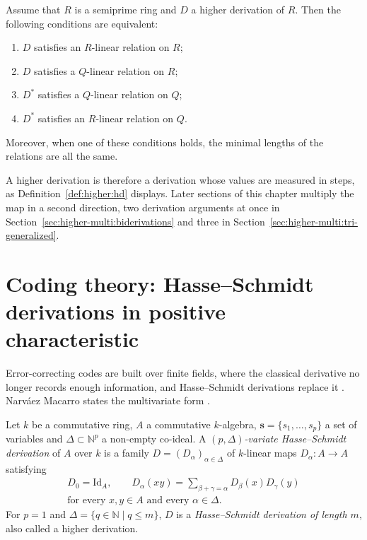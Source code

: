 \begin{theorem}\label{thm:higher:relations}
Assume that $R$ is a semiprime ring and $D$ a higher derivation of $R$.
Then the following conditions are equivalent:
\begin{enumerate}[label=(\roman*)]
\item $D$ satisfies an $R$-linear relation on $R$;
\item $D$ satisfies a $Q$-linear relation on $R$;
\item $D^{*}$ satisfies a $Q$-linear relation on $Q$;
\item $D^{*}$ satisfies an $R$-linear relation on $Q$.
\end{enumerate}
Moreover, when one of these conditions holds, the minimal lengths of the
relations are all the same.
\end{theorem}

A higher derivation is therefore a derivation whose values are measured in
steps, as Definition~\ref{def:higher:hd} displays. Later sections of this
chapter multiply the map in a second direction, two derivation arguments at
once in Section~\ref{sec:higher-multi:biderivations} and three in
Section~\ref{sec:higher-multi:tri-generalized}.

\section{Coding theory: Hasse--Schmidt derivations in positive characteristic}\label{sec:higher-multi:coding}

Error-correcting codes are built over finite fields, where the classical
derivative no longer records enough information, and Hasse--Schmidt
derivations replace it \cite[Introduction]{NarvaezMacarro2020}. Narv\'aez
Macarro states the multivariate form
\cite[Definition~2.1.1, p.~15]{NarvaezMacarro2020}.

\begin{definition}\label{def:higher:hasse-schmidt-variate}
Let $k$ be a commutative ring, $A$ a commutative $k$-algebra, $\mathbf{s}=\{s_1,\dots,s_p\}$
a set of variables and $\Delta\subset\mathbb{N}^p$ a non-empty co-ideal. A
\emph{$(p,\Delta)$-variate Hasse--Schmidt derivation} of $A$ over $k$ is a
family $D=(D_\alpha)_{\alpha\in\Delta}$ of $k$-linear maps $D_\alpha\colon A\to A$
satisfying
\begin{gather*}
D_0=\mathrm{Id}_A,\qquad D_\alpha(xy)=\sum_{\beta+\gamma=\alpha}D_\beta(x)D_\gamma(y)\\
\text{for every }x,y\in A\text{ and every }\alpha\in\Delta.
\end{gather*}
For $p=1$ and $\Delta=\{q\in\mathbb{N}\mid q\leq m\}$, $D$ is a
\emph{Hasse--Schmidt derivation of length $m$}, also called a higher derivation.
\end{definition}


